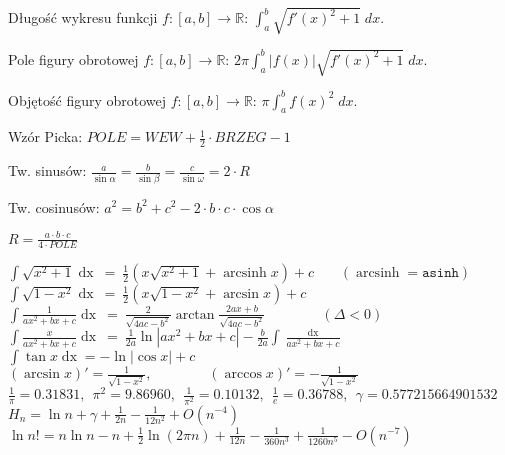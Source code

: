 
\usepackage[utf8]{inputenc}
\usepackage{polski}
\usepackage{amsfonts}
\usepackage{amsmath}
\DeclareMathOperator{\arcsinh}{arcsinh}
\DeclareMathOperator{\dx}{ dx}


Długość wykresu funkcji $f : [a, b] \to \mathbb{R}$:
  \hfill
  $\int_a^b \sqrt{f'(x)^2 + 1} \; dx$.

Pole figury obrotowej $f : [a, b] \to \mathbb{R}$:
  \hfill
  $2 \pi \int_a^b |f(x)| \sqrt{f'(x)^2 + 1} \; dx$.

Objętość figury obrotowej $f : [a, b] \to \mathbb{R}$:
  \hfill
  $\pi \int_a^b f(x)^2 \; dx$.


Wzór Picka:
  \hfill
  $POLE = WEW + \frac{1}{2} \cdot BRZEG  - 1$

Tw. sinusów:
  \hfill
  $\frac{a}{\sin \alpha} = \frac{b}{\sin \beta} = \frac{c}{\sin \omega} = 2 \cdot R$

Tw. cosinusów:
  \hfill
  $a^2 = b^2 + c^2 - 2 \cdot b \cdot c \cdot \cos \alpha$

$R = \frac{a \cdot b \cdot c}{4 \cdot POLE}$


 \( \int \sqrt{x^2 + 1} \dx\ =\ \frac12 \left( x\sqrt{x^2 + 1} + \arcsinh x \right) + c\) 
  \ \ \ $(\arcsinh = \mathtt{asinh})$ \\
  \( \int \sqrt{1 - x^2} \dx\ =\ \frac12 \left( x\sqrt{1 - x^2} + \arcsin x \right) + c\) \\
  \( \int \frac{1}{ax^2 + bx + c} \dx\ =\ \frac{2}{\sqrt{4ac - b^2}} \arctan
      \frac{2ax + b}{\sqrt{4ac - b^2}} \qquad \qquad (\Delta < 0)\) \\
  \( \int \frac{x}{ax^2 + bx + c} \dx\ =\ \frac{1}{2a} \ln |ax^2 + bx + c|
      - \frac{b}{2a} \int \frac{\dx}{ax^2 + bx + c} \) \\
  \( \int \tan x \dx = - \ln |\cos x| + c \) \\
  \( (\arcsin x)' = \frac{1}{\sqrt{1 - x^2}}, \qquad \qquad
     (\arccos x)' = -\frac{1}{\sqrt{1 - x^2}} \) \\
  \( \frac1{\pi} = 0.31831,\ \ \pi^2 = 9.86960,\ \ \frac1{\pi^2} = 0.10132,\ \ \frac1e = 0.36788,
  \ \ \gamma = 0.577215664901532\) \\
  \( H_n = \ln n + \gamma + \frac1{2n} - \frac1{12n^2} + O(n^{-4}) \) \\
  \( \ln n! = n \ln n - n + \frac12 \ln(2 \pi n) + \frac1{12n} - \frac1{360n^3} + \frac1{1260n^5}
  - O(n^{-7}) \)

